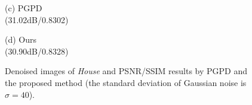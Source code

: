 \documentclass[runningheads]{llncs}
\begin{document}
\begin{figure}
{\begin{minipage}[t]{0.244\textwidth}
{\footnotesize (c) PGPD \\(31.02dB/0.8302)}
\end{minipage}
\begin{minipage}[t]{0.244\textwidth}
\centering
{}
{\footnotesize (d) Ours \\(30.90dB/0.8328)}
\end{minipage}
}
\caption{Denoised images of \textsl{House} and PSNR/SSIM results by PGPD and the proposed method (the standard deviation of Gaussian noise is $\sigma=40$).}
\label{fig25}
\end{figure}
\end{document}
